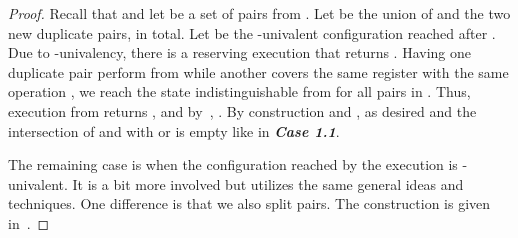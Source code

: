 \begin{proof}
Recall that  and let  be a set of  pairs from .
Let  be the union of  and the two new duplicate pairs,  in total.
Let  be the -univalent configuration reached after .
Due to -univalency, there is a reserving execution  that returns .
Having one duplicate pair perform  from  while another covers the same register with the same operation , 
  we reach the state indistinguishable from  for all  pairs in .
Thus, execution  from  returns , and by~, .
By construction  and , as desired and 
  the intersection of  and  with  or  is empty like in \emph{\textbf{Case 1.1}}.

The remaining case is when the configuration reached by the execution  is -univalent.
It is a bit more involved but utilizes the same general ideas and techniques.
One difference is that we also split pairs.
The construction is given in~.
\end{proof}
 